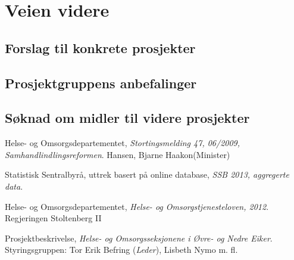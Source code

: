 \documentclass[11pt]{report} %
\begin{document}
\chapter{Veien videre}\label{chap:vvidere}
  \section{Forslag til konkrete prosjekter}\label{chap:vvidere_konkpr}
  \section{Prosjektgruppens anbefalinger}\label{chap:vvidere_anbef}
  \section{Søknad om midler til videre prosjekter}\label{chap:vvidere_soknmid}


\renewcommand{\bibname}{Kilder:}
\begin{thebibliography}{9}

    Helse- og Omsorgsdepartementet,
    \emph{Stortingsmelding 47, 06/2009, Samhandlindlingsreformen}.
    Hansen, Bjarne Haakon(Minister)

    Statistisk Sentralbyrå, uttrek basert på online database,
    \emph{SSB 2013, aggregerte data}.

    Helse- og Omsorgsdepartementet,
    \emph{Helse- og Omsorgstjenesteloven, 2012}.
    Regjeringen Stoltenberg II

    Prosjektbeskrivelse,
    \emph{Helse- og Omsorgsseksjonene i Øvre- og Nedre Eiker}.
    Styringsgruppen: Tor Erik Befring (\emph{Leder}), Lisbeth Nymo m. fl.


\end{thebibliography}

\listoffigures
\listoftables
\end{document}
